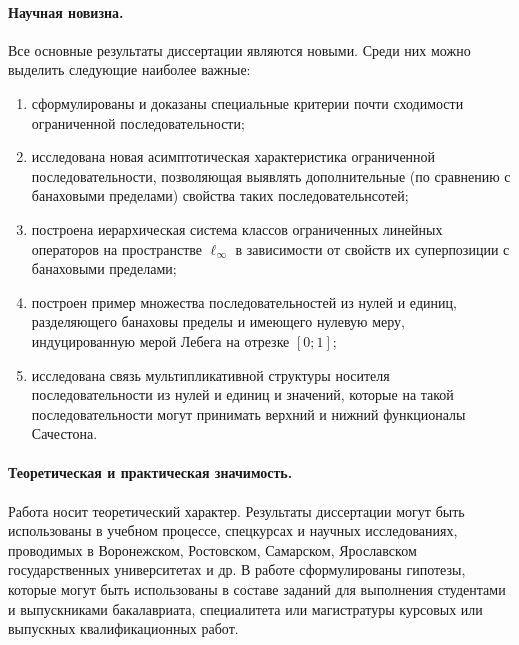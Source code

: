 \paragraph{Научная новизна.}
Все основные результаты диссертации являются новыми.
Среди них можно выделить следующие наиболее важные:
\begin{enumerate}
	\item
		сформулированы и доказаны специальные критерии почти сходимости
		ограниченной последовательности;
	\item
		исследована новая асимптотическая характеристика ограниченной последовательности,
		позволяющая выявлять дополнительные (по сравнению с банаховыми пределами)
		свойства таких последовательнсотей;
	\item
		построена иерархическая система классов ограниченных линейных операторов
		на пространстве $\ell_\infty$ в зависимости от свойств их суперпозиции с банаховыми пределами;
	\item
		построен пример множества последовательностей из нулей и единиц, разделяющего банаховы пределы
		и имеющего нулевую меру, индуцированную мерой Лебега на отрезке $[0;1]$;
	\item
		исследована связь мультипликативной структуры носителя последовательности из нулей и единиц
		и значений, которые на такой последовательности могут принимать верхний и нижний функционалы Сачестона.
\end{enumerate}


\paragraph{Теоретическая и практическая значимость.}
Работа носит теоретический характер.
Результаты диссертации могут быть использованы в учебном процессе, спецкурсах и научных исследованиях,
проводимых в Воронежском, Ростовском, Самарском, Ярославском государственных университетах и др.
В работе сформулированы гипотезы,
которые могут быть использованы в составе заданий для выполнения
студентами и выпускниками бакалавриата, специалитета или магистратуры
курсовых или выпускных квалификационных работ.


